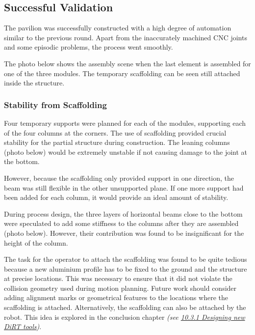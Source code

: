


\subsection{Successful Validation}
\label{subsection:exploration_5_successful_validation}

The pavilion was successfully constructed with a high degree of automation similar to the previous round. Apart from the inaccurately machined CNC joints and some episodic problems, the process went smoothly. 

The photo below shows the assembly scene when the last element is assembled for one of the three modules. The temporary scaffolding can be seen still attached inside the structure. 




\subsubsection{Stability from Scaffolding}
\label{subsubsection:exploration_5_stability_from_scaffolding}

Four temporary supports were planned for each of the modules, supporting each of the four columns at the corners. The use of scaffolding provided crucial stability for the partial structure during construction. The leaning columns (photo below) would be extremely unstable if not causing damage to the joint at the bottom. 

However, because the scaffolding only provided support in one direction, the beam was still flexible in the other unsupported plane. If one more support had been added for each column, it would provide an ideal amount of stability. 

During process design, the three layers of horizontal beams close to the bottom were speculated to add some stiffness to the columns after they are assembled (photo below). However, their contribution was found to be insignificant for the height of the column. 




The task for the operator to attach the scaffolding was found to be quite tedious because a new aluminium profile has to be fixed to the ground and the structure at precise locations. This was necessary to ensure that it did not violate the collision geometry used during motion planning. Future work should consider adding alignment  marks or geometrical features to the locations where the scaffolding is attached. Alternatively, the scaffolding can also be attached by the robot. This idea is explored in the conclusion chapter \textit{(see \ul{10.3.1 Designing new DiRT tools})}.

